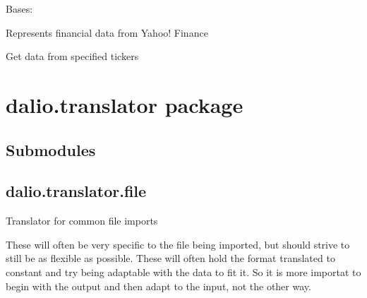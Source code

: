 \documentclass[letterpaper,10pt,english]{sphinxmanual}
\begin{document}
\begin{fulllineitems}
\label{\detokenize{dalio.external:dalio.external.web.YahooDR}}
Bases: 

Represents financial data from Yahoo! Finance

\begin{fulllineitems}
\label{\detokenize{dalio.external:dalio.external.web.YahooDR.request}}
Get data from specified tickers

\end{fulllineitems}


\end{fulllineitems}



\chapter{dalio.translator package}
\label{\detokenize{dalio.translator:dalio-translator-package}}\label{\detokenize{dalio.translator::doc}}

\section{Submodules}
\label{\detokenize{dalio.translator:submodules}}

\section{dalio.translator.file}
\label{\detokenize{dalio.translator:module-dalio.translator.file}}\label{\detokenize{dalio.translator:dalio-translator-file}}
Translator for common file imports

These will often be very specific to the file being imported, but should
strive to still be as flexible as possible. These will often hold the format
translated to constant and try being adaptable with the data to fit it. So
it is more importat to begin with the output and then adapt to the input, not
the other way.
\end{document}
